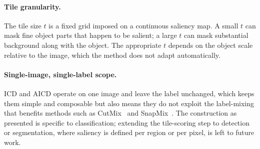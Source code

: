 \paragraph{Tile granularity.}
The tile size $t$ is a fixed grid imposed on a continuous saliency map.  A small
$t$ can mask fine object parts that happen to be salient; a large $t$ can mask
substantial background along with the object.  The appropriate $t$ depends on
the object scale relative to the image, which the method does not adapt
automatically.

\paragraph{Single-image, single-label scope.}
ICD and AICD operate on one image and leave the label unchanged, which keeps
them simple and composable but also means they do not exploit the label-mixing
that benefits methods such as CutMix~\citep{yun2019cutmix} and
SnapMix~\citep{huang2021snapmix}.  The construction as presented is specific to
classification; extending the tile-scoring step to detection or segmentation,
where saliency is defined per region or per pixel, is left to future work.

